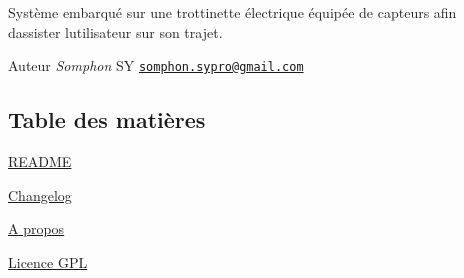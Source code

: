Système embarqué sur une trottinette électrique équipée de capteurs afin d\textquotesingle{}assister l\textquotesingle{}utilisateur sur son trajet.

\begin{DoxyAuthor}{Auteur}
{\itshape Somphon} SY \href{mailto:somphon.sypro@gmail.com}{\tt somphon.\+sypro@gmail.\+com}
\end{DoxyAuthor}
\hypertarget{index_section_tdm}{}\subsection{Table des matières}\label{index_section_tdm}

\begin{DoxyItemize}
\item \hyperlink{page__r_e_a_d_m_e}{R\+E\+A\+D\+ME}
\item \hyperlink{page_changelog}{Changelog}
\item \hyperlink{page_about}{A propos}
\item \hyperlink{page_licence}{Licence G\+PL} 
\end{DoxyItemize}
